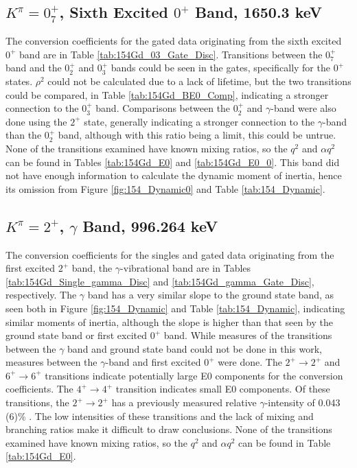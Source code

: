 



\subsection{$K^{\pi}=0^+_7$, Sixth Excited $0^+$ Band, 1650.3 keV}

The conversion coefficients for the gated data originating from the sixth excited $0^+$ band are in Table \ref{tab:154Gd_03_Gate_Disc}. Transitions between the $0^+_7$ band and the $0^+_2$ and $0^+_3$ bands could be seen in the gates, specifically for the $0^+$ states. $\rho^2$ could not be calculated due to a lack of lifetime, but the two transitions could be compared, in Table \ref{tab:154Gd_BE0_Comp}, indicating a stronger connection to the $0^+_3$ band. Comparisons between the $0^+_2$ and $\gamma$-band were also done using the $2^+$ state, generally indicating a stronger connection to the $\gamma$-band than the $0^+_2$ band, although with this ratio being a limit, this could be untrue. None of the transitions examined have known mixing ratios, so the $q^2$ and $\alpha q^2$ can be found in Tables \ref{tab:154Gd_E0} and \ref{tab:154Gd_E0_0}. This band did not have enough information to calculate the dynamic moment of inertia, hence its omission from Figure \ref{fig:154_Dynamic0} and Table \ref{tab:154_Dynamic}.



\subsection{$K^{\pi}=2^+$, $\gamma$ Band, 996.264 keV}

The conversion coefficients for the singles and gated data originating from the first excited $2^+$ band, the $\gamma$-vibrational band are in Tables \ref{tab:154Gd_Single_gamma_Disc} and \ref{tab:154Gd_gamma_Gate_Disc}, respectively. The $\gamma$ band has a very similar slope to the ground state band, as seen both in Figure \ref{fig:154_Dynamic} and Table \ref{tab:154_Dynamic}, indicating similar moments of inertia, although the slope is higher than that seen by the ground state band or first excited $0^+$ band. While measures of the transitions between the $\gamma$ band and ground state band could not be done in this work, measures between the $\gamma$-band and first excited $0^+$ were done. The $2^+\rightarrow2^+$ and $6^+\rightarrow6^+$ transitions indicate potentially large E0 components for the conversion coefficients. The $4^+\rightarrow4^+$ transition indicates small E0 components. Of these transitions, the $2^+\rightarrow2^+$ has a previously measured relative $\gamma$-intensity of 0.043 (6)\% \citep{reich09:_nds_154}. The low intensities of these transitions and the lack of mixing and branching ratios make it difficult to draw conclusions. None of the transitions examined have known mixing ratios, so the $q^2$ and $\alpha q^2$ can be found in Table \ref{tab:154Gd_E0}.

